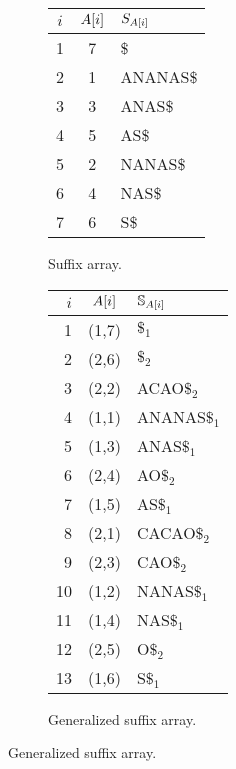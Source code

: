 \begin{figure}[b]
\begin{center}
\caption[Example of (generalized) suffix array]{(Generalized) suffix array. () Suffix array of the string {\ttfamily ANANAS\$}. () Generalized suffix array of the string collection $\Strings = \{$ {\ttfamily ANANAS$\$_1$}, {\ttfamily CACAO$\$_2$} $\}$.}

\begin{subfigure}[t]{0.45\textwidth}
\begin{center}
\caption[Example of suffix array]{Suffix array.}
\label{fig:sa}
\ttfamily
\begin{tabular}{ccl}
$i$ & $A[i]$ & $S_{A[i]}$\\
\midrule
1 & 7 & \$\\
2 & 1 & ANANAS\$\\
3 & 3 & ANAS\$\\
4 & 5 & AS\$\\
5 & 2 & NANAS\$\\
6 & 4 & NAS\$\\
7 & 6 & S\$\\
\end{tabular}
\end{center}
\end{subfigure}%
\begin{subfigure}[t]{0.45\textwidth}
\begin{center}
\caption[Example of generalized suffix array]{Generalized suffix array.}
\label{fig:gsa}
\ttfamily
\begin{tabular}{rcl}
$i$ & $A[i]$ & $\mathbb{S}_{A[i]}$\\
\midrule
1 & (1,7) & $\$_1$\\
2 & (2,6) & $\$_2$\\
3 & (2,2) & ACAO$\$_2$\\
4 & (1,1) & ANANAS$\$_1$\\
5 & (1,3) & ANAS$\$_1$\\
6 & (2,4) & AO$\$_2$\\
7 & (1,5) & AS$\$_1$\\
8 & (2,1) & CACAO$\$_2$\\
9 & (2,3) & CAO$\$_2$\\
10 & (1,2) & NANAS$\$_1$\\
11 & (1,4) & NAS$\$_1$\\
12 & (2,5) & O$\$_2$\\
13 & (1,6) & S$\$_1$\\
\end{tabular}
\end{center}
\end{subfigure}

\end{center}
\end{figure}

